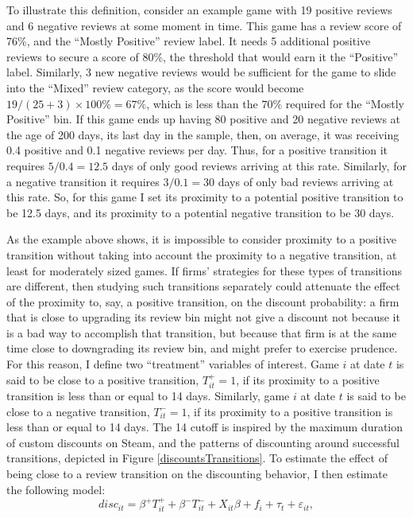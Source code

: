 \documentclass[
  12pt,
  pagebackref]{article}
\begin{document}
To illustrate this definition, consider an example game with 19 positive
reviews and 6 negative reviews at some moment in time. This game has a
review score of 76\%, and the ``Mostly Positive'' review label. It needs
5 additional positive reviews to secure a score of 80\%, the threshold
that would earn it the ``Positive'' label. Similarly, 3 new negative
reviews would be sufficient for the game to slide into the ``Mixed''
review category, as the score would become
\(19/(25 + 3) \times 100\%= 67\%\), which is less than the \(70\%\)
required for the ``Mostly Positive'' bin. If this game ends up having 80
positive and 20 negative reviews at the age of 200 days, its last day in
the sample, then, on average, it was receiving 0.4 positive and 0.1
negative reviews per day. Thus, for a positive transition it requires
\(5/0.4 = 12.5\) days of only good reviews arriving at this rate.
Similarly, for a negative transition it requires \(3 / 0.1 = 30\) days
of only bad reviews arriving at this rate. So, for this game I set its
proximity to a potential positive transition to be 12.5 days, and its
proximity to a potential negative transition to be 30 days.

As the example above shows, it is impossible to consider proximity to a
positive transition without taking into account the proximity to a
negative transition, at least for moderately sized games. If firms'
strategies for these types of transitions are different, then studying
such transitions separately could attenuate the effect of the proximity
to, say, a positive transition, on the discount probability: a firm that
is close to upgrading its review bin might not give a discount not
because it is a bad way to accomplish that transition, but because that
firm is at the same time close to downgrading its review bin, and might
prefer to exercise prudence. For this reason, I define two ``treatment''
variables of interest. Game \(i\) at date \(t\) is said to be close to a
positive transition, \(T_{it}^+ = 1\), if its proximity to a positive
transition is less than or equal to 14 days. Similarly, game \(i\) at
date \(t\) is said to be close to a negative transition,
\(T_{it}^- = 1\), if its proximity to a positive transition is less than
or equal to 14 days. The 14 cutoff is inspired by the maximum duration
of custom discounts on Steam, and the patterns of discounting around
successful transitions, depicted in Figure \ref{discountsTransitions}.
To estimate the effect of being close to a review transition on the
discounting behavior, I then estimate the following model:
\begin{equation}\label{potTransitionsReg}
disc_{it} = \beta^+ T_{it}^+ + \beta^- T_{it}^- + X_{it}\beta + f_i + \tau_t + \varepsilon_{it},
\end{equation}
\end{document}
